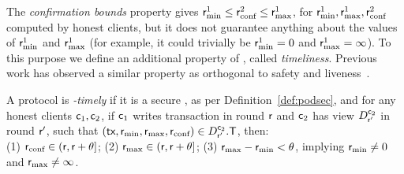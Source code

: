 \begin{definition}
\begin{description}
\end{description}
\end{definition}


The \emph{confirmation bounds} property gives $\rmin^1 \leq \rconf^2 \leq \rmax^1$, for $\rmin^1, \rmax^1, \rconf^2$ computed by honest clients, but it does not guarantee anything about the values of $\rmin^1$ and $\rmax^1$ (for example, it could trivially be $\rmin^1=0$ and $\rmax^1=\infty$).
To this purpose we define an additional property of \podtm, called \emph{timeliness}.
Previous work has observed a similar property as orthogonal to safety and liveness~\cite{EPRINT:TziSriZin23}.

\begin{definition}\label{def:pod-timely}
    A \podtm protocol is \emph{\parTemp-timely} if it is a secure \podtm, as per Definition~\ref{def:podsec}, and for any honest clients $\client_1,\client_2$, if $\client_1$ writes transaction \tx in round $\round$ and $\client_2$ has view $\podView{\client_2}{\round'}$ in round $\round'$, such that $(\tx, \rmin, \rmax, \rconf) \in \podView{\client_2}{\round'}.\txSet$, then:\\
        (1) $\rconf \in (\round, \round + \parTemp]$;
        (2) $\rmax \in (\round, \round + \parTemp]$;
        (3) $\rmax - \rmin < \parTemp$, implying $\rmin \neq 0$ and $\rmax \neq \infty$.
\end{definition}


